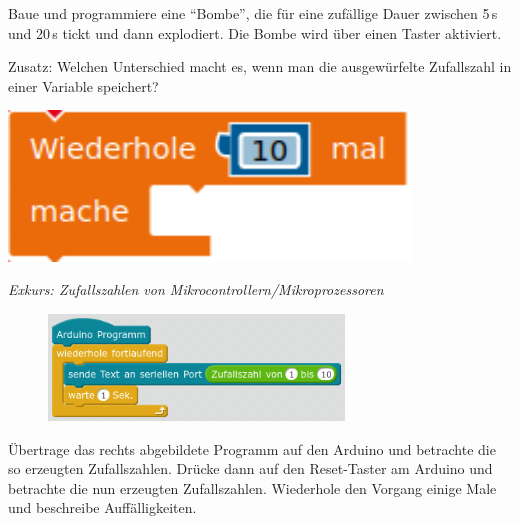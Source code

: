 \bigskip
\begin{minipage}{0.73\textwidth}
	\begin{projekt}\label{proj:bombe}
		Baue und programmiere eine \enquote{Bombe}, die für eine zufällige Dauer zwischen 5\,s und 20\,s tickt und dann explodiert. Die Bombe wird über einen Taster aktiviert.
		
		Zusatz: Welchen Unterschied macht es, wenn man die ausgewürfelte Zufallszahl in einer Variable speichert?
	\end{projekt}
\end{minipage}
\hfill
\begin{minipage}{0.25\textwidth}
	\centering
	\includegraphics[width=0.8\textwidth]{./pics/wdh10mal.png}
\end{minipage}

\bigskip

\begin{aufgabe} \emph{Exkurs: Zufallszahlen von Mikrocontrollern/Mikroprozessoren}
	
	\begin{figure}
		\centering
		\vspace{-0.5\baselineskip}
		\includegraphics[width=0.7\textwidth]{./pics/zufallszahlengenerator.png}
	\end{figure}
	Übertrage das rechts abgebildete Programm auf den Arduino und betrachte die so erzeugten Zufallszahlen. Drücke dann auf den Reset-Taster am Arduino und betrachte die nun erzeugten Zufallszahlen. Wiederhole den Vorgang einige Male und beschreibe Auffälligkeiten.
\end{aufgabe}


